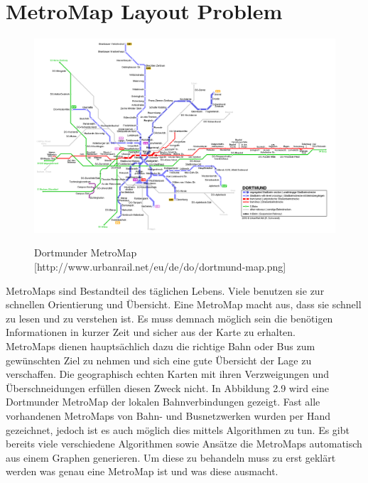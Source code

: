 \section{MetroMap Layout Problem}
\label{MetroMap}
%
\begin{figure}[t]
	\centering
	{\includegraphics[scale=0.3]{bilder/dortmundmap}\label{fig_dortmundmap}
	}\\
	\caption[Dortmunder MetroMap]{Dortmunder MetroMap [http://www.urbanrail.net/eu/de/do/dortmund-map.png]}
	\label{fig_dortmundmap}
\end{figure}


MetroMaps sind Bestandteil des täglichen Lebens. Viele benutzen sie zur schnellen Orientierung und Übersicht. Eine MetroMap macht aus, dass sie schnell zu lesen und zu verstehen ist. Es muss demnach möglich sein die benötigen Informationen in kurzer Zeit und sicher aus der Karte zu erhalten. \\

MetroMaps dienen hauptsächlich dazu die richtige Bahn oder Bus zum gewünschten Ziel zu nehmen und sich eine gute Übersicht der Lage zu verschaffen. Die geographisch echten Karten mit ihren Verzweigungen und Überschneidungen erfüllen diesen Zweck nicht. In Abbildung 2.9 wird eine Dortmunder MetroMap der lokalen Bahnverbindungen gezeigt. Fast alle vorhandenen MetroMaps von Bahn- und Busnetzwerken wurden per Hand gezeichnet, jedoch ist es auch möglich dies mittels Algorithmen zu tun. Es gibt bereits viele verschiedene Algorithmen sowie Ansätze die MetroMaps automatisch aus einem Graphen generieren. Um diese zu behandeln muss zu erst geklärt werden was genau eine MetroMap ist und was diese ausmacht. \\


